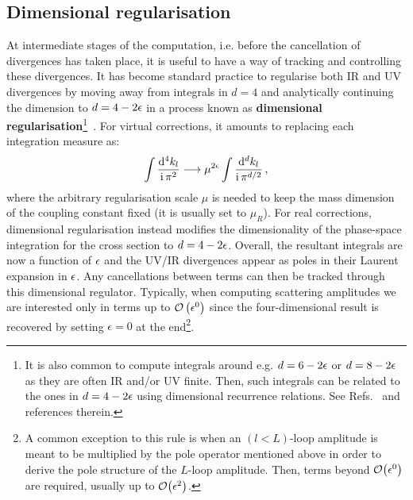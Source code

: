 \documentclass[main.tex]{subfiles}
\begin{document}
\subsection{Dimensional regularisation} \label{sec:dimreg}
At intermediate stages of the computation, i.e. before the cancellation of divergences has taken place, it is useful to have a way of tracking and controlling these divergences. It has become standard practice to regularise both IR and UV divergences by moving away from integrals in $d=4$ and analytically continuing the dimension to $d=4-2\epsilon$ in a process known as \textbf{dimensional regularisation}\footnote{It is also common to compute integrals around e.g. $d=6-2\epsilon$ or $d=8-2\epsilon$ as they are often IR and/or UV finite. Then, such integrals can be related to the ones in $d=4-2\epsilon$ using dimensional recurrence relations. See Refs.~\cite{Bern:1993kr, Lee:2012cn} and references therein.}~\cite{bollini1964analytic, THOOFT1972189}. For virtual corrections, it amounts to replacing each integration measure as:
\begin{equation}
    \int \frac{\mathrm{d}^4 k_l}{\mathrm{i} \, \pi^{2}} \longrightarrow \mu^{2\epsilon} \int \frac{\mathrm{d}^d k_l}{\mathrm{i} \, \pi^{d/2}}\,,
\end{equation}
where the arbitrary regularisation scale $\mu$ is needed to keep the mass dimension of the coupling constant fixed (it is usually set to $\mu_R$). For real corrections, dimensional regularisation instead modifies the dimensionality of the phase-space integration for the cross section to $d=4-2\epsilon$. Overall, the resultant integrals are now a function of $\epsilon$ and the UV/IR divergences appear as poles in their Laurent expansion in $\epsilon$. Any cancellations between terms can then be tracked through this dimensional regulator. Typically, when computing scattering amplitudes we are interested only in terms up to $\mathcal{O}\left(\epsilon^0\right)$ since the four-dimensional result is recovered by setting $\epsilon = 0$ at the end\footnote{A common exception to this rule is when an $(l<L)$-loop amplitude is meant to be multiplied by the pole operator mentioned above in order to derive the pole structure of the $L$-loop amplitude. Then, terms beyond $\mathcal{O}\big(\epsilon^0\big)$ are required, usually up to $\mathcal{O}\big(\epsilon^2\big)$.}.
\end{document}
